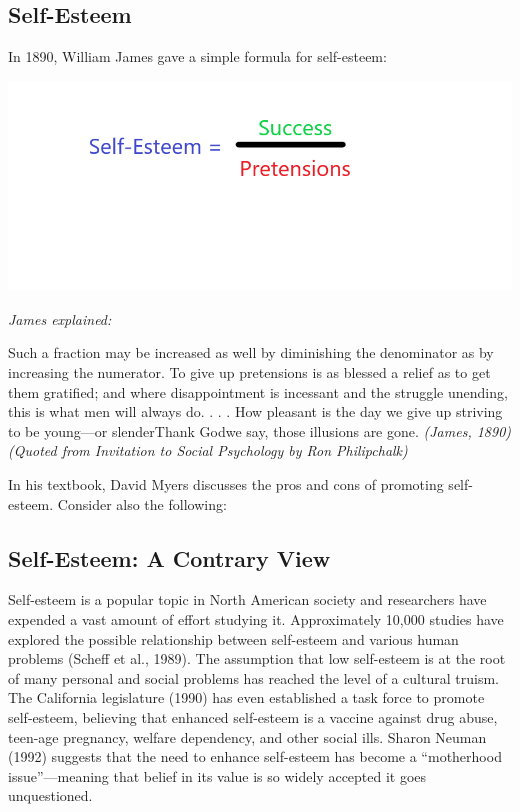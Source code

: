 \documentclass[
]{book}
\begin{document}
\hypertarget{self-esteem}{%
\subsection*{Self-Esteem}\label{self-esteem}}

In 1890, William James gave a simple formula for self-esteem:

\includegraphics{assets/unit_5/Unit5_Topic2_Image.png}

\emph{James explained:}

Such a fraction may be increased as well by diminishing the denominator as by increasing the numerator. To give up pretensions is as blessed a relief as to get them gratified; and where disappointment is incessant and the struggle unending, this is what men will always do. . . . How pleasant is the day we give up striving to be young---or slenderThank Godwe say, those illusions are gone. \emph{(James, 1890) (Quoted from Invitation to Social Psychology by Ron Philipchalk)}

In his textbook, David Myers discusses the pros and cons of promoting self-esteem. Consider also the following:

\hypertarget{self-esteem-a-contrary-view}{%
\subsection*{Self-Esteem: A Contrary View}\label{self-esteem-a-contrary-view}}

Self-esteem is a popular topic in North American society and researchers have expended a vast amount of effort studying it. Approximately 10,000 studies have explored the possible relationship between self-esteem and various human problems (Scheff et al., 1989). The assumption that low self-esteem is at the root of many personal and social problems has reached the level of a cultural truism. The California legislature (1990) has even established a task force to promote self-esteem, believing that enhanced self-esteem is a vaccine against drug abuse, teen-age pregnancy, welfare dependency, and other social ills. Sharon Neuman (1992) suggests that the need to enhance self-esteem has become a ``motherhood issue''---meaning that belief in its value is so widely accepted it goes unquestioned.
\end{document}
